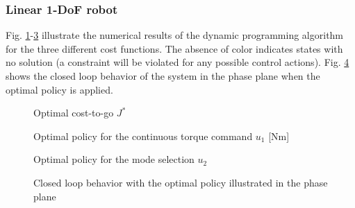 \subsubsection{Linear 1-DoF robot}
Fig. \ref{fig:J}-\ref{fig:u1} illustrate the numerical results of the dynamic programming algorithm for the three different cost functions. The absence of color indicates states with no solution (a constraint will be violated for any possible control actions). Fig. \ref{fig:phase_plane} shows the closed loop behavior of the system in the phase plane when the optimal policy is applied.

\begin{figure}[H]
        \centering
        \caption{Optimal cost-to-go $J^*$}\label{fig:J}
\end{figure}

\begin{figure}[H]
        \centering
        \caption{Optimal policy for the continuous torque command $u_1$ [Nm]}\label{fig:u0}
\end{figure}

\begin{figure}[H]
        \centering
        \caption{Optimal policy for the mode selection $u_2$}\label{fig:u1}
\end{figure}

\begin{figure}[H]
        \centering
        \caption[Closed loop behavior in the phase plane]{Closed loop behavior with the optimal policy illustrated in the phase plane}\label{fig:phase_plane}
\end{figure}

